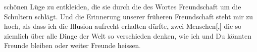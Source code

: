 \begin{ledgroupsized}[t]{13cm}
               schönen Lüge zu entkleiden, die sie durch die \label{T_L03520-6v}\label{T_L03520-6h} des  Wortes Freundschaft um die Schultern schlägt. Und die Erinnerung
               unserer früheren Freundschaft steht mir zu hoch, als dass ich die Illusion aufrecht
               erhalten dürfte, zwei Menschen{[},{]} die so ziemlich über alle Dinge
               der Welt so verschieden denken, wie ich und Du könnten Freunde bleiben oder weiter
               Freunde heissen.\pend
           
         
         \endnumbering{}\end{ledgroupsized}  \newcommand{\dateiname}{L03520}\newcommand{\titel}{Arthur Schnitzler an Paul Goldmann, nicht abgesandt, 28. 1. 1907}\newcommand{\editorInnen}{Martin Anton Müller und Laura Untner}
      